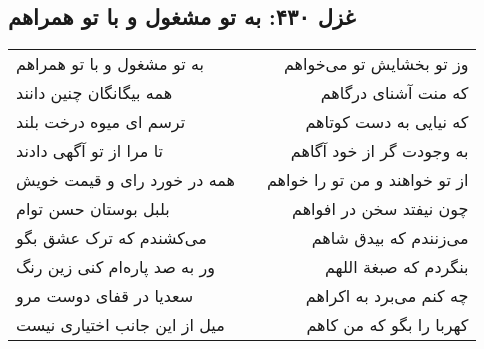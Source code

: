 \begin{center}
\section*{غزل ۴۳۰: به تو مشغول و با تو همراهم}
\label{sec:430}
\begin{longtable}{l p{0.5cm} r}
به تو مشغول و با تو همراهم
&&
وز تو بخشایش تو می‌خواهم
\\
همه بیگانگان چنین دانند
&&
که منت آشنای درگاهم
\\
ترسم ای میوه درخت بلند
&&
که نیایی به دست کوتاهم
\\
تا مرا از تو آگهی دادند
&&
به وجودت گر از خود آگاهم
\\
همه در خورد رای و قیمت خویش
&&
از تو خواهند و من تو را خواهم
\\
بلبل بوستان حسن توام
&&
چون نیفتد سخن در افواهم
\\
می‌کشندم که ترک عشق بگو
&&
می‌زنندم که بیدق شاهم
\\
ور به صد پاره‌ام کنی زین رنگ
&&
بنگردم که صبغة اللهم
\\
سعدیا در قفای دوست مرو
&&
چه کنم می‌برد به اکراهم
\\
میل از این جانب اختیاری نیست
&&
کهربا را بگو که من کاهم
\\
\end{longtable}
\end{center}
